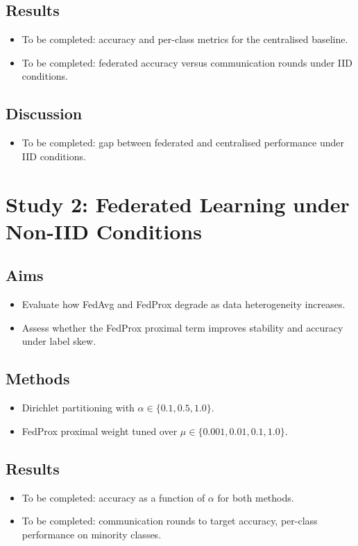 \documentclass[12pt,openany,a4paper]{book}
\begin{document}
\section{Results}
\begin{itemize}
  \item To be completed: accuracy and per-class metrics for the centralised baseline.
  \item To be completed: federated accuracy versus communication rounds under IID conditions.
\end{itemize}

\section{Discussion}
\begin{itemize}
  \item To be completed: gap between federated and centralised performance under IID conditions.
\end{itemize}

\chapter{Study 2: Federated Learning under Non-IID Conditions}

\section{Aims}
\begin{itemize}
  \item Evaluate how FedAvg and FedProx degrade as data heterogeneity increases.
  \item Assess whether the FedProx proximal term improves stability and accuracy under label skew.
\end{itemize}

\section{Methods}
\begin{itemize}
  \item Dirichlet partitioning with $\alpha \in \{0.1, 0.5, 1.0\}$.
  \item FedProx proximal weight tuned over $\mu \in \{0.001, 0.01, 0.1, 1.0\}$.
\end{itemize}

\section{Results}
\begin{itemize}
  \item To be completed: accuracy as a function of $\alpha$ for both methods.
  \item To be completed: communication rounds to target accuracy, per-class performance on minority classes.
\end{itemize}
\end{document}
